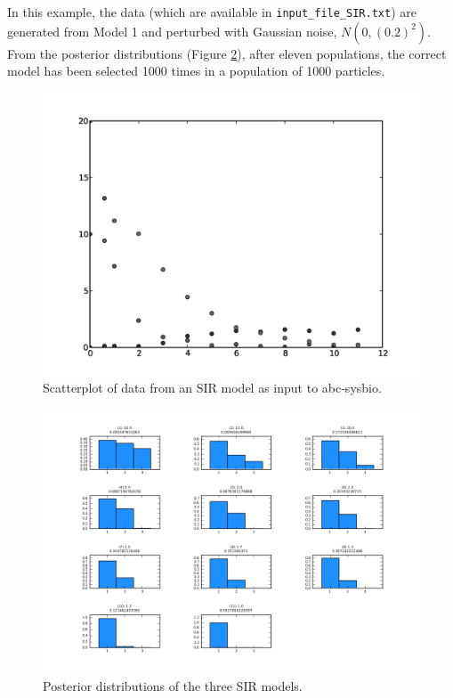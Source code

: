 \documentclass[a4paper]{report}
\begin{document}
In this example, the data (which are available in \verb$input_file_SIR.txt$) are generated from Model 1 and perturbed with Gaussian noise, $N(0, (0.2)^2)$. From the posterior distributions (Figure \ref{ModelDistributionSIR}), after eleven populations, the correct model has been selected 1000 times in a population of 1000 particles. 
\begin{figure}[htbp]
\begin{center}
\includegraphics[width=1.0\textwidth]{Graphics/dataSIR.png}
\caption{Scatterplot of data from an SIR model as input to abc-sysbio. \label{dataSIR}}
\end{center}
\end{figure}
\begin{figure}[htbp]
\begin{center}
\includegraphics[width=1.0\textwidth]{Graphics/ModelDistributionSIR.png}
\caption{Posterior distributions of the three SIR models. \label{ModelDistributionSIR}}
\end{center}
\end{figure}
\end{document}
